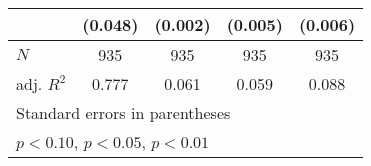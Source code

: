 {\begin{tabular}{l*{4}{c}}
            &     (0.048)         &     (0.002)         &     (0.005)         &     (0.006)         \\
\hline
\(N\)       &         935         &         935         &         935         &         935         \\
adj. \(R^{2}\)&       0.777         &       0.061         &       0.059         &       0.088         \\
\hline\hline
\multicolumn{5}{l}{\footnotesize Standard errors in parentheses}\\
\multicolumn{5}{l}{\footnotesize \sym{*} \(p<0.10\), \sym{**} \(p<0.05\), \sym{***} \(p<0.01\)}\\
\end{tabular}
}
